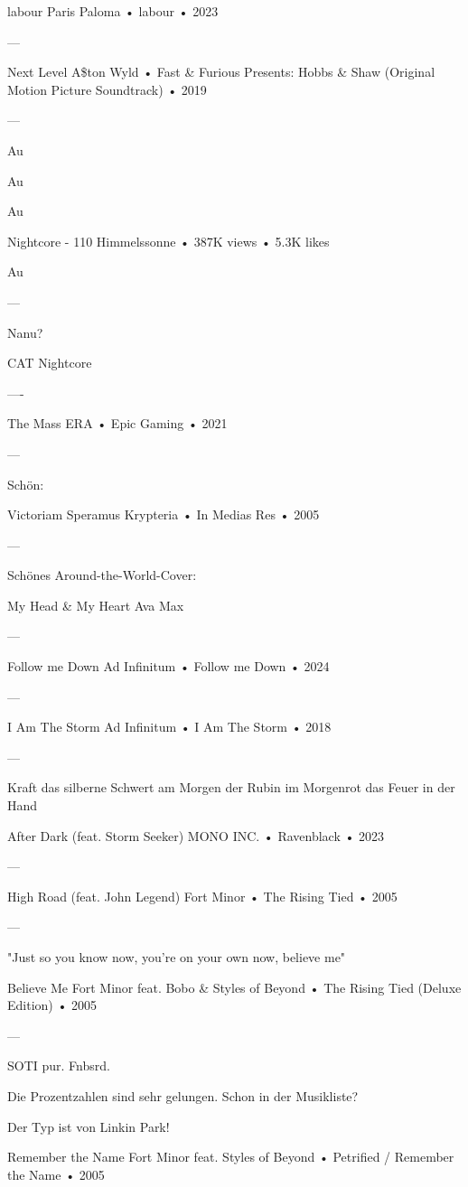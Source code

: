 labour
Paris Paloma
 •
labour
 •
2023

—

Next Level
A\$ton Wyld
 •
Fast & Furious Presents: Hobbs & Shaw (Original Motion Picture Soundtrack)
 •
2019

—

Au

Au

Au

Nightcore - 110
Himmelssonne
 •
387K views
 •
5.3K likes


Au

—

Nanu?

CAT Nightcore

—-

The Mass
ERA
 •
Epic Gaming
 •
2021

—

Schön:

Victoriam Speramus
Krypteria
 •
In Medias Res
 •
2005


—

Schönes Around-the-World-Cover:

My Head & My Heart
Ava Max

—

Follow me Down
Ad Infinitum
 •
Follow me Down
 •
2024

—

I Am The Storm
Ad Infinitum
 •
I Am The Storm
 •
2018


—

Kraft
das silberne Schwert am Morgen
der Rubin im Morgenrot
das Feuer in der Hand

After Dark (feat. Storm Seeker)
MONO INC.
 •
Ravenblack
 •
2023


—

High Road (feat. John Legend)
Fort Minor
 •
The Rising Tied
 •
2005

—

"Just so you know now, you're on your own now, believe me"

Believe Me
Fort Minor feat. Bobo & Styles of Beyond
 •
The Rising Tied (Deluxe Edition)
 •
2005

—

SOTI pur.
Fnbsrd.

Die Prozentzahlen sind sehr gelungen.
Schon in der Musikliste?

Der Typ ist von Linkin Park!


Remember the Name
Fort Minor feat. Styles of Beyond
 •
Petrified / Remember the Name
 •
2005

